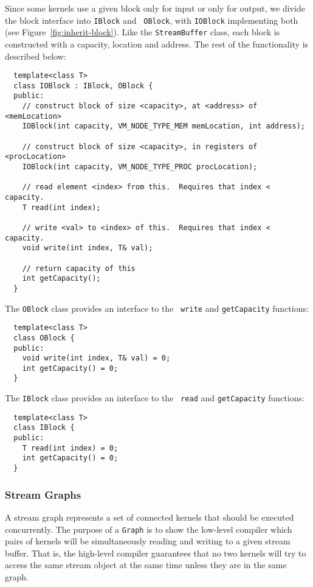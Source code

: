Since some kernels use a given block only for input or only for
output, we divide the block interface into {\tt IBlock} and {\tt
OBlock}, with {\tt IOBlock} implementing both (see
Figure~\ref{fig:inherit-block}).  Like the {\tt StreamBuffer} class,
each block is constructed with a capacity, location and address.  The
rest of the functionality is described below:

{\small
\begin{verbatim}
  template<class T>
  class IOBlock : IBlock, OBlock {
  public:
    // construct block of size <capacity>, at <address> of <memLocation>
    IOBlock(int capacity, VM_NODE_TYPE_MEM memLocation, int address);

    // construct block of size <capacity>, in registers of <procLocation>
    IOBlock(int capacity, VM_NODE_TYPE_PROC procLocation);

    // read element <index> from this.  Requires that index < capacity.
    T read(int index);

    // write <val> to <index> of this.  Requires that index < capacity.
    void write(int index, T& val);

    // return capacity of this
    int getCapacity();
  }
\end{verbatim}}

\noindent The {\tt OBlock} class provides an interface to the {\tt
write} and {\tt getCapacity} functions:

{\small
\begin{verbatim}
  template<class T>
  class OBlock {
  public:
    void write(int index, T& val) = 0;
    int getCapacity() = 0;
  }
\end{verbatim}}

\noindent The {\tt IBlock} class provides an interface to the {\tt
read} and {\tt getCapacity} functions:

{\small
\begin{verbatim}
  template<class T>
  class IBlock {
  public:
    T read(int index) = 0;
    int getCapacity() = 0;
  }
\end{verbatim}}

\subsubsection{Stream Graphs}
\label{sec:streamgraph}

A stream graph represents a set of connected kernels that should be
executed concurrently.  The purpose of a {\tt Graph} is to show the
low-level compiler which pairs of kernels will be simultaneously
reading and writing to a given stream buffer.  That is, the high-level
compiler guarantees that no two kernels will try to access the same
stream object at the same time unless they are in the same graph.

